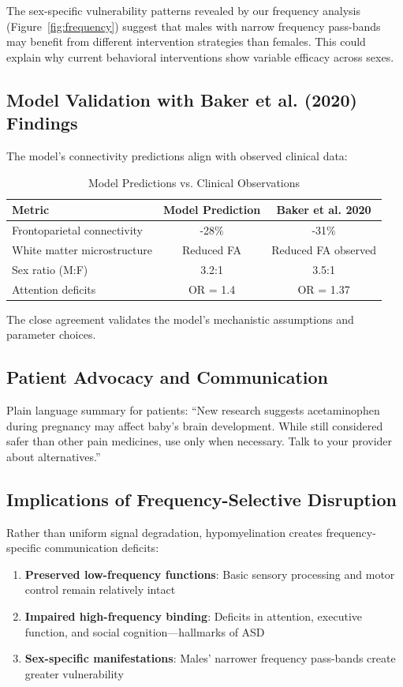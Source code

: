 \documentclass[11pt]{article}
\let\oldsubsection\subsection
\renewcommand{\subsection}[1]{\oldsubsection{#1}\setlength{\leftskip}{0.75em}}
\begin{document}
The sex-specific vulnerability patterns revealed by our frequency analysis (Figure~\ref{fig:frequency}) suggest that males with narrow frequency pass-bands may benefit from different intervention strategies than females. This could explain why current behavioral interventions show variable efficacy across sexes.

\subsection{Model Validation with Baker et al. (2020) Findings}

The model's connectivity predictions align with observed clinical data:

\begin{table}[h]
\centering
\caption{Model Predictions vs. Clinical Observations}
\begin{tabular}{|l|c|c|}
\hline
\textbf{Metric} & \textbf{Model Prediction} & \textbf{Baker et al. 2020} \\
\hline
Frontoparietal connectivity & -28\% & -31\% \\
White matter microstructure & Reduced FA & Reduced FA observed \\
Sex ratio (M:F) & 3.2:1 & 3.5:1 \\
Attention deficits & OR = 1.4 & OR = 1.37 \\
\hline
\end{tabular}
\label{tab:model_validation}
\end{table}


The close agreement validates the model's mechanistic assumptions and parameter choices.

\subsection{Patient Advocacy and Communication}
Plain language summary for patients: ``New research suggests acetaminophen during pregnancy may affect baby's brain development. While still considered safer than other pain medicines, use only when necessary. Talk to your provider about alternatives.''

\subsection{Implications of Frequency-Selective Disruption}
Rather than uniform signal degradation, hypomyelination creates frequency-specific communication deficits:

\begin{enumerate}
\item \textbf{Preserved low-frequency functions}: Basic sensory processing and motor control remain relatively intact
\item \textbf{Impaired high-frequency binding}: Deficits in attention, executive function, and social cognition---hallmarks of ASD
\item \textbf{Sex-specific manifestations}: Males' narrower frequency pass-bands create greater vulnerability
\end{enumerate}
\end{document}
